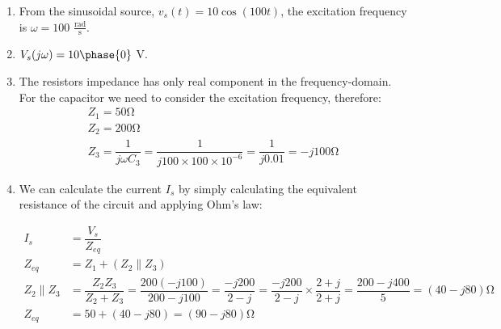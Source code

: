 \documentclass[10pt,a4paper]{memoir}
\begin{document}
\begin{solution}
  \begin{enumerate}
    \item From the sinusoidal source, $v_s(t)=10\cos{\left(100t\right)}$, the excitation frequency is $\omega=100$ $\frac{\mbox{rad}}{\mbox{s}}$.
    \item $V_s(j\omega)=10\phase{0}$ \si{\volt}.
    \item The resistors impedance has only real component in the frequency-domain. For the capacitor we need to consider the excitation frequency, therefore:
    \begin{gather*}
      Z_1 = 50 \si{\ohm}\\
      Z_2 = 200 \si{\ohm}\\
      Z_3 = \dfrac{1}{j\omega C_3} = \dfrac{1}{j 100\times100\times10^{-6}} = \dfrac{1}{j0.01} = -j100\si{\ohm}
    \end{gather*}
    \item We can calculate the current $I_s$ by simply calculating the equivalent resistance of the circuit and applying Ohm's law:
    \begin{figure}[!h]
      \centering
      \qquad
  \end{figure}
  \begin{align*}
    I_s &= \dfrac{V_s}{Z_{eq}} \\
    Z_{eq} &= Z_1 + \left( Z_2  \parallel Z_3 \right) \\
    Z_2\parallel Z_3 &= \dfrac{Z_2 Z_3}{Z_2+Z_3} = \dfrac{200(-j100)}{200 - j100} = \dfrac{-j200}{2 - j} = \dfrac{-j200}{2 - j}\times\dfrac{2 + j}{2 + j} = \dfrac{200-j400}{5} = \left( 40 - j80 \right)\si{\ohm} \\
    Z_{eq} &= 50 + \left( 40 - j80 \right) = \left( 90 - j80 \right)\si{\ohm} \\

\end{align*}
\end{enumerate}
\end{solution}
\end{document}
